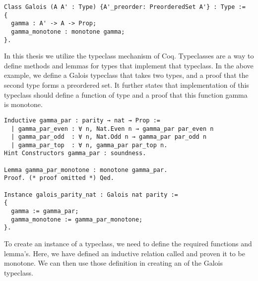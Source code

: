 \begin{verbatim}
Class Galois (A A' : Type) {A'_preorder: PreorderedSet A'} : Type :=
{
  gamma : A' -> A -> Prop;
  gamma_monotone : monotone gamma;
}.
\end{verbatim}

In this thesis we utilize the typeclass mechanism of Coq. Typeclasses are a way
to define methods and lemmas for types that implement that typeclass. In the
above example, we define a Galois typeclass that takes two types, and a proof
that the second type  forms a preordered set. It further states that
implementation of this typeclass should define a function  of type
 and a proof that this function gamma is monotone.

\begin{verbatim}
Inductive gamma_par : parity → nat → Prop :=
  | gamma_par_even : ∀ n, Nat.Even n → gamma_par par_even n
  | gamma_par_odd  : ∀ n, Nat.Odd n → gamma_par par_odd n
  | gamma_par_top  : ∀ n, gamma_par par_top n.
Hint Constructors gamma_par : soundness.

Lemma gamma_par_monotone : monotone gamma_par.
Proof. (* proof omitted *) Qed.

Instance galois_parity_nat : Galois nat parity :=
{
  gamma := gamma_par;
  gamma_monotone := gamma_par_monotone;
}.
\end{verbatim}

To create an instance of a typeclass, we need to define the required functions
and lemma's. Here, we have defined an inductive relation called 
and proven it to be monotone. We can then use those definition in creating an
 of the Galois typeclass.

